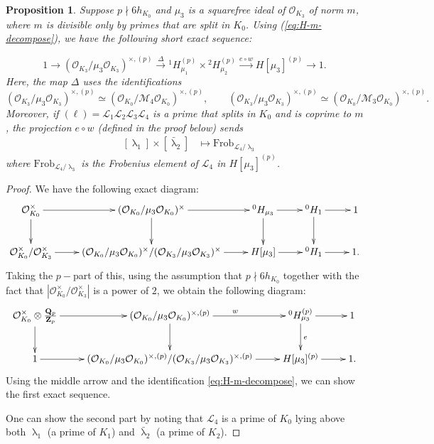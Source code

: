 \documentclass[10pt,letterpaper]{amsart}
\theoremstyle{plain}
\theoremstyle{definition}
\theoremstyle{definition}
\theoremstyle{plain}
\newtheorem{prop}[thm]{Proposition}
\theoremstyle{plain}
\theoremstyle{plain}
\theoremstyle{remark}
\numberwithin{equation}{section}
\DeclareMathOperator{\la}{\lambda}
\def\cL{{\mathcal L}}
\def\cM{\mathcal M}
\def\cO{\mathcal O}
\newcommand{\Q}{\mathbf{Q}}
\newcommand{\Z}{\mathbf{Z}}
\begin{document}
\begin{prop}\label{ringclass} Suppose $p\nmid 6h_{K_0}$ and $\mu_3$ is a squarefree ideal of $\cO_{K_3}$ of norm $m$, where $m$ is divisible only by primes that are split in $K_0$. Using (\ref{eq:H-m-decompose}), we have the following short exact sequence:

\[
1\rightarrow(\cO_{K_3}/\mu_3\cO_{K_3})^{\times, (p)}\xrightarrow{\Delta}{^{1}H}_{\mu_1}^{(p)}\times {^{2}H}_{\mu_2}^{(p)}\xrightarrow{e\circ w} H[\mu_3]^{(p)}\rightarrow 1.
\]
Here, the map $\Delta$ uses the identifications 
\[(\cO_{K_3}/\mu_3\cO_{K_3})^{\times,(p)} \simeq (\cO_{K_0}/\cM_4\cO_{K_0})^{\times,(p)},\qquad (\cO_{K_3}/\mu_3\cO_{K_3})^{\times,(p)} \simeq (\cO_{K_0}/\cM_3\cO_{K_0})^{\times,(p)}.
\]
Moreover, if $(\ell)=\cL_1\cL_2\cL_3\cL_4$ is a prime that splits in $K_0$ and is coprime to $m$, the projection $e\circ w$ (defined in the proof below) sends 
\begin{align*}
      \quad  [\la_1]\times[\bar{\la}_2]&\mapsto \mathrm{Frob}_{\cL_4/\la_3} 
    \end{align*}
where $\mathrm{Frob}_{\cL_4/\la_3} $ is the Frobenius element of $\cL_4$ in $H[\mu_3]^{(p)}$. 
\end{prop}

\begin{proof}
We have the following exact diagram: 
\[
\xymatrix{
\cO_{K_0}^\times\ar[r]\ar[d]&(\cO_{K_0}/\mu_3\cO_{K_0})^\times\ar[r]\ar[d]&^{0}H_{\mu_3}\ar[r]\ar[d]&^{0}H_1\ar[r]\ar[d]&1\\
\cO_{K_0}^\times/\cO_{K_3}^\times\ar[r]&(\cO_{K_0}/\mu_3\cO_{K_0})^\times/(\cO_{K_3}/\mu_3\cO_{K_3})^\times\ar[r]&H[\mu_3]\ar[r]&^{0}H_1\ar[r]&1.
}
\]
Taking the $p-$part of this, using the assumption that $p\nmid 6h_{K_0}$ together with the fact that $|\cO_{K_0}^\times/\cO_{K_3}^\times|$ is a power of $2$, we obtain the following diagram:
\[
\xymatrix{
\cO_{K_0}^{\times}\otimes \frac{\Q_p}{\Z_p}\ar[r]\ar[d]&(\cO_{K_0}/\mu_3\cO_{K_0})^{\times,(p)}\ar[r]^{w}\ar[d]&^{0}H_{\mu_3}^{(p)}\ar[r]\ar[d]^{e}&1\\
1\ar[r]&(\cO_{K_0}/\mu_3\cO_{K_0})^{\times,(p)}/(\cO_{K_3}/\mu_3\cO_{K_3})^{\times,(p)}\ar[r]&H[\mu_3]^{(p)}\ar[r]&1.
}
\]
Using the middle arrow and the identification \ref{eq:H-m-decompose}, we can show the first exact sequence.

One can show the second part by noting that $\cL_4$ is a prime of $K_0$ lying above both $\la_1$ (a prime of $K_1$) and $\bar{\la}_2$ (a prime of $K_2$).
\end{proof}
\end{document}
